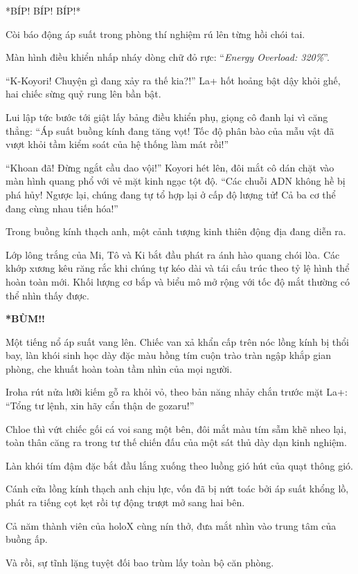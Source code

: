 \documentclass[../main.tex]{subfiles}
\begin{document}
*BÍP! BÍP! BÍP!*

Còi báo động áp suất trong phòng thí nghiệm rú lên từng hồi chói tai.

Màn hình điều khiển nhấp nháy dòng chữ đỏ rực: ``\textit{Energy Overload: 320\%}''.

``K-Koyori! Chuyện gì đang xảy ra thế kia?!'' La+ hốt hoảng bật dậy khỏi ghế, hai chiếc sừng quỷ rung lên bần bật.

Lui lập tức bước tới giật lấy bảng điều khiển phụ, giọng cô đanh lại vì căng thẳng: ``Áp suất buồng kính đang tăng vọt! Tốc độ phân bào của mẫu vật đã vượt khỏi tầm kiểm soát của hệ thống làm mát rồi!''

``Khoan đã! Đừng ngắt cầu dao vội!'' Koyori hét lên, đôi mắt cô dán chặt vào màn hình quang phổ với vẻ mặt kinh ngạc tột độ. ``Các chuỗi ADN không hề bị phá hủy! Ngược lại, chúng đang tự tổ hợp lại ở cấp độ lượng tử! Cả ba cơ thể đang cùng nhau tiến hóa!''

Trong buồng kính thạch anh, một cảnh tượng kinh thiên động địa đang diễn ra.

Lớp lông trắng của Mi, Tô và Ki bắt đầu phát ra ánh hào quang chói lòa. Các khớp xương kêu răng rắc khi chúng tự kéo dài và tái cấu trúc theo tỷ lệ hình thể hoàn toàn mới. Khối lượng cơ bắp và biểu mô mở rộng với tốc độ mắt thường có thể nhìn thấy được.

    {\Large \textbf{*BÙM!!}}

Một tiếng nổ áp suất vang lên. Chiếc van xả khẩn cấp trên nóc lồng kính bị thổi bay, làn khói sinh học dày đặc màu hồng tím cuộn trào tràn ngập khắp gian phòng, che khuất hoàn toàn tầm nhìn của mọi người.

Iroha rút nửa lưỡi kiếm gỗ ra khỏi vỏ, theo bản năng nhảy chắn trước mặt La+: ``Tổng tư lệnh, xin hãy cẩn thận de gozaru!''

Chloe thì vứt chiếc gối cá voi sang một bên, đôi mắt màu tím sẫm khẽ nheo lại, toàn thân căng ra trong tư thế chiến đấu của một sát thủ dày dạn kinh nghiệm.

Làn khói tím đậm đặc bắt đầu lắng xuống theo luồng gió hút của quạt thông gió.

Cánh cửa lồng kính thạch anh chịu lực, vốn đã bị nứt toác bởi áp suất khổng lồ, phát ra tiếng cọt kẹt rồi tự động trượt mở sang hai bên.

Cả năm thành viên của holoX cùng nín thở, đưa mắt nhìn vào trung tâm của buồng ấp.

Và rồi, sự tĩnh lặng tuyệt đối bao trùm lấy toàn bộ căn phòng.
\end{document}
